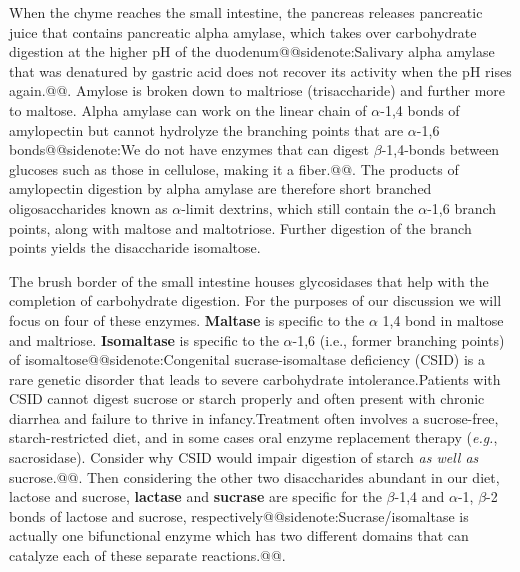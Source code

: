 \documentclass{tufte-handout}
\makeatletter
\def\sidenote#1{@@sidenote:#1@@}
\makeatother
\begin{document}
When the chyme reaches the small intestine, the pancreas releases pancreatic juice that contains pancreatic alpha amylase, which takes over carbohydrate digestion at the higher pH of the duodenum\sidenote{Salivary alpha amylase that was denatured by gastric acid does not recover its activity when the pH rises again.}. Amylose is broken down to maltriose (trisaccharide) and further more to maltose. Alpha amylase can work on the linear chain of $\alpha$-1,4 bonds of amylopectin but cannot hydrolyze the branching points that are $\alpha$-1,6 bonds\sidenote{We do not have enzymes that can digest $\beta$-1,4-bonds between glucoses such as those in cellulose, making it a fiber.}. The products of amylopectin digestion by alpha amylase are therefore short branched oligosaccharides known as $\alpha$-limit dextrins, which still contain the $\alpha$-1,6 branch points, along with maltose and maltotriose.  Further digestion of the branch points yields the disaccharide isomaltose.

The brush border of the small intestine houses glycosidases that help with the completion of carbohydrate digestion. For the purposes of our discussion we will focus on four of these enzymes. \textbf{Maltase} is specific to the $\alpha$ 1,4 bond in maltose and maltriose. \textbf{Isomaltase} is specific to the $\alpha$-1,6 (i.e., former branching points) of isomaltose\sidenote{Congenital sucrase-isomaltase deficiency (CSID) is a rare genetic disorder that leads to severe carbohydrate intolerance.Patients with CSID cannot digest sucrose or starch properly and often present with chronic diarrhea and failure to thrive in infancy.Treatment often involves a sucrose-free, starch-restricted diet, and in some cases oral enzyme replacement therapy (\textit{e.g.}, sacrosidase).  Consider why CSID would impair digestion of starch \emph{as well as} sucrose.}. Then considering the other two disaccharides abundant in our diet, lactose and sucrose, \textbf{lactase} and \textbf{sucrase} are specific for the $\beta$-1,4 and $\alpha$-1, $\beta$-2 bonds of lactose and sucrose, respectively\sidenote{Sucrase/isomaltase is actually one bifunctional enzyme which has two different domains that can catalyze each of these separate reactions.}.
\end{document}
